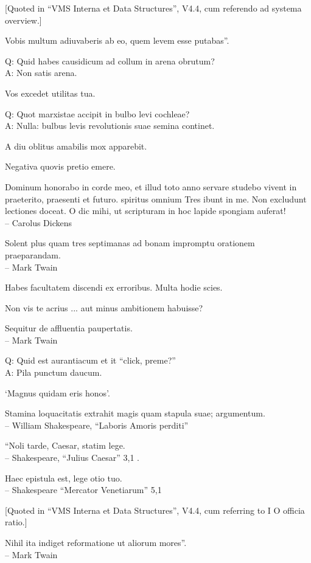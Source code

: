 \documentclass[titlepage,12pt]{memoir}
\begin{document}
[Quoted in “VMS Interna et Data Structures”, V4.4, cum
referendo ad systema overview.]

Vobis multum adiuvaberis ab eo, quem levem esse putabas”.

Q: Quid habes causidicum ad collum in arena obrutum?\\
A: Non satis arena.

Vos excedet utilitas tua.

Q: Quot marxistae accipit in bulbo levi cochleae?\\
A: Nulla: bulbus levis revolutionis suae semina continet.

A diu oblitus amabilis mox apparebit.

Negativa quovis pretio emere.

Dominum honorabo in corde meo, et illud toto anno servare studebo
vivent in praeterito, praesenti et futuro. spiritus omnium
Tres ibunt in me. Non excludunt lectiones
doceat. O dic mihi, ut scripturam in hoc lapide spongiam auferat!
\\-- Carolus Dickens

Solent plus quam tres septimanas ad bonam impromptu orationem praeparandam.
\\-- Mark Twain

Habes facultatem discendi ex erroribus. Multa hodie scies.

Non vis te acrius ... aut minus ambitionem habuisse?

Sequitur de affluentia paupertatis.
\\-- Mark Twain

Q: Quid est aurantiacum et it “click, preme?”\\
A: Pila punctum daucum.

‘Magnus quidam eris honos’.

Stamina loquacitatis extrahit magis quam stapula suae;
argumentum.
\\-- William Shakespeare, “Laboris Amoris perditi”

“Noli tarde, Caesar, statim lege.
\\-- Shakespeare, “Julius Caesar” 3,1 .

Haec epistula est, lege otio tuo.
\\-- Shakespeare “Mercator Venetiarum” 5,1

[Quoted in “VMS Interna et Data Structures”, V4.4, cum
referring to I \/O officia ratio.]

Nihil ita indiget reformatione ut aliorum mores”.
\\-- Mark Twain
\end{document}
